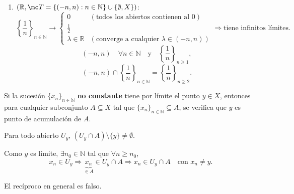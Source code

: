 \begin{ejem}
\begin{enumerate}
        \item \((\mathbb{R}, \mc T = \{ (-n, n) : n \in \mathbb{N} \} \cup \{ \emptyset, X \})\):
        \[
             \left\{\frac{1}{n}\right\}_{n \in \mathbb{N}} \longrightarrow
            \begin{cases}
                0 & (\text{todos los abiertos contienen al } 0) \\
                \frac{1}{2} & \\
                \lambda \in \mathbb{R} & (\text{converge a cualquier } \lambda \in (-n, n))
            \end{cases}
            \Rightarrow \text{tiene infinitos límites.}
        \]
        \[
            (-n, n) \quad \forall n \in \mathbb{N} \quad \text{y} \quad  \left\{\frac{1}{n}\right\}_{n \ge 1},
        \]
        \[
            (-n, n) \cap  \left\{\frac{1}{n}\right\}_{n \in \mathbb{N}} =  \left\{\frac{1}{n}\right\}_{n \ge 2}.
        \]
    \end{enumerate}
\end{ejem}

\begin{prop}
    Si la sucesión \(\{x_n\}_{n \in \mathbb{N}}\) \textbf{no constante} tiene por límite el punto \(y \in X\), entonces para cualquier subconjunto \(A \subseteq X\) tal que \(\{x_n\}_{n \in \mathbb{N}} \subseteq A\), se verifica que \(y\) es punto de acumulación de \(A\).
\end{prop}

\begin{dem}
    Para todo abierto \(U_y\), \((U_y \cap A) \setminus \{y\} \ne \emptyset\).
    
    Como \(y\) es límite, \(\exists n_0 \in \mathbb{N}\) tal que \(\forall n \ge n_0\),
    \[
        x_n \in U_y \Rightarrow \underbrace{x_n}_{\in A} \in U_y \cap A \Rightarrow x_n \in U_y \cap A \quad \text{con } x_n \ne y.
    \]
\end{dem}

\begin{obs}
    El recíproco en general es falso.
\end{obs}

